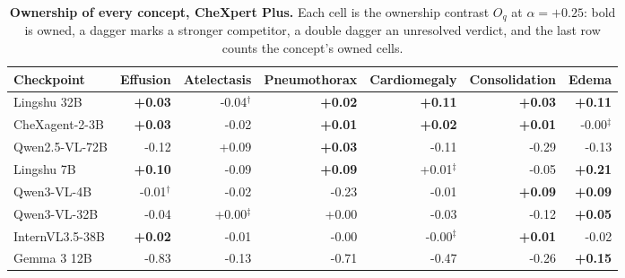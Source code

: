 \begin{table}[htbp]
\centering
\scriptsize
\setlength{\tabcolsep}{4pt}
\caption{\textbf{Ownership of every concept, CheXpert Plus.} Each cell is the ownership contrast $O_q$ at $\alpha=+0.25$: bold is owned, a dagger marks a stronger competitor, a double dagger an unresolved verdict, and the last row counts the concept's owned cells.}
\label{tab:cf-own-chexpert}
\begin{tabular}{lrrrrrr}
\toprule
Checkpoint & \multicolumn{1}{c}{Effusion} & \multicolumn{1}{c}{Atelectasis} & \multicolumn{1}{c}{Pneumothorax} & \multicolumn{1}{c}{Cardiomegaly} & \multicolumn{1}{c}{Consolidation} & \multicolumn{1}{c}{Edema}\\
\midrule
Lingshu 32B & \cellcolor{cfSlate2}\textbf{+0.03} & \cellcolor{cfTerra2}-0.04$^{\dagger}$ & \cellcolor{cfSlate2}\textbf{+0.02} & \cellcolor{cfSlate3}\textbf{+0.11} & \cellcolor{cfSlate2}\textbf{+0.03} & \cellcolor{cfSlate3}\textbf{+0.11} \\
CheXagent-2-3B & \cellcolor{cfSlate2}\textbf{+0.03} & \cellcolor{cfTerra2}-0.02 & \cellcolor{cfSlate1}\textbf{+0.01} & \cellcolor{cfSlate1}\textbf{+0.02} & \cellcolor{cfSlate1}\textbf{+0.01} & \cellcolor{cfTerra1}-0.00$^{\ddagger}$ \\
Qwen2.5-VL-72B & \cellcolor{cfTerra3}-0.12 & \cellcolor{cfSlate2}+0.09 & \cellcolor{cfSlate2}\textbf{+0.03} & \cellcolor{cfTerra3}-0.11 & \cellcolor{cfTerra4}-0.29 & \cellcolor{cfTerra3}-0.13 \\
Lingshu 7B & \cellcolor{cfSlate2}\textbf{+0.10} & \cellcolor{cfTerra2}-0.09 & \cellcolor{cfSlate2}\textbf{+0.09} & \cellcolor{cfSlate1}+0.01$^{\ddagger}$ & \cellcolor{cfTerra2}-0.05 & \cellcolor{cfSlate3}\textbf{+0.21} \\
Qwen3-VL-4B & \cellcolor{cfTerra1}-0.01$^{\dagger}$ & \cellcolor{cfTerra1}-0.02 & \cellcolor{cfTerra3}-0.23 & \cellcolor{cfTerra1}-0.01 & \cellcolor{cfSlate2}\textbf{+0.09} & \cellcolor{cfSlate2}\textbf{+0.09} \\
Qwen3-VL-32B & \cellcolor{cfTerra2}-0.04 & \cellcolor{cfSlate1}+0.00$^{\ddagger}$ & \cellcolor{cfSlate1}+0.00 & \cellcolor{cfTerra2}-0.03 & \cellcolor{cfTerra3}-0.12 & \cellcolor{cfSlate2}\textbf{+0.05} \\
InternVL3.5-38B & \cellcolor{cfSlate1}\textbf{+0.02} & \cellcolor{cfTerra1}-0.01 & \cellcolor{cfTerra1}-0.00 & \cellcolor{cfTerra1}-0.00$^{\ddagger}$ & \cellcolor{cfSlate1}\textbf{+0.01} & \cellcolor{cfTerra2}-0.02 \\
Gemma 3 12B & \cellcolor{cfTerra4}-0.83 & \cellcolor{cfTerra3}-0.13 & \cellcolor{cfTerra4}-0.71 & \cellcolor{cfTerra4}-0.47 & \cellcolor{cfTerra4}-0.26 & \cellcolor{cfSlate3}\textbf{+0.15} \\

\end{tabular}
\end{table}
